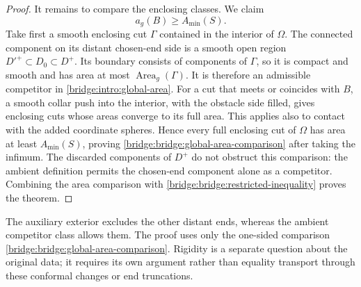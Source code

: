 \begin{proof}
It remains to compare the enclosing classes. We claim
\begin{equation}
\label{bridge:bridge:global-area-comparison}
                         a_g(B)\ge A_{\min}(S).
\end{equation}
Take first a smooth enclosing cut $\Gamma$ contained in the interior
of $\Omega$. The connected component on its distant chosen-end side is
a smooth open region $D'^+\subset D_0\subset D^+$. Its boundary
consists of components of $\Gamma$, so it is compact and smooth and
has area at most $\operatorname{Area}_g(\Gamma)$. It is therefore an
admissible competitor in \eqref{bridge:intro:global-area}.
For a cut that meets or coincides with $B$, a smooth collar push into
the interior, with the obstacle side filled, gives enclosing cuts
whose areas converge to its full area. This applies also to contact
with the added coordinate spheres. Hence every full enclosing cut
of $\Omega$ has area at least $A_{\min}(S)$, proving
\eqref{bridge:bridge:global-area-comparison} after taking the infimum.
The discarded components of $D^+$ do not obstruct this comparison:
the ambient definition permits the chosen-end component alone as
a competitor. Combining the area comparison with
\eqref{bridge:bridge:restricted-inequality} proves the theorem.
\end{proof}

The auxiliary exterior excludes the other distant ends, whereas the
ambient competitor class allows them. The proof uses only the
one-sided comparison \eqref{bridge:bridge:global-area-comparison}.
Rigidity is a separate question about the original data; it requires
its own argument rather than equality transport through these
conformal changes or end truncations.
